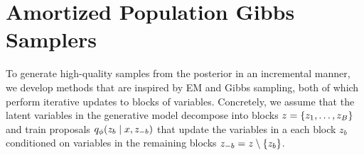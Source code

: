 \documentclass{article}
\theoremstyle{definition}
\begin{document}

\vspace{-0.5em}
\section{Amortized Population Gibbs Samplers}
\label{sec:amortized-gibbs}
To generate high-quality samples from the posterior in an incremental manner, we develop methods that are inspired by EM and Gibbs sampling, both of which perform iterative updates to blocks of variables. Concretely, we assume that the latent variables in the generative model decompose into blocks $z = \{z_1, \ldots, z_B\}$ and train proposals $q_\phi(z_b \mid x, z_{-b})$ that update the variables in a each block $z_{b}$ conditioned on variables in the remaining blocks $z_{-b} = z \setminus \{z_b\}$.
\end{document}
